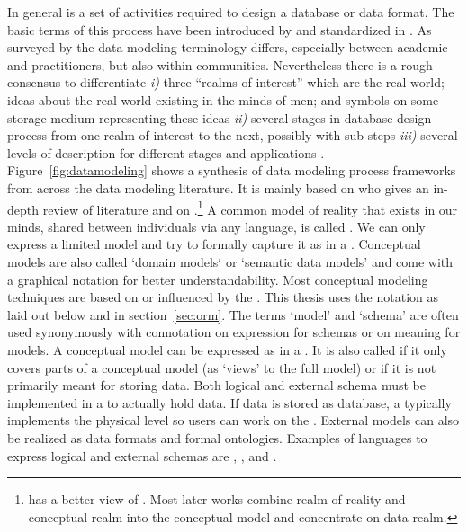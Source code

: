 In general  is a set of activities required to design a
database or data format. The basic terms of this process have been introduced
by \cite{CODASYL1971,Steel1975b} and standardized in \cite{ISO9007}. As surveyed
by \textcite[p.~34ff.]{Simsion2007} the data modeling terminology differs,
especially between academic and practitioners, but also within communities.
Nevertheless there is a rough consensus to differentiate \emph{i)} three
``realms of interest'' which are the real world; ideas about the real world
existing in the minds of men; and symbols on some storage medium representing
these ideas \cite[p. II-1]{Steel1975b} \emph{ii)} several stages in database
design process from one realm of interest to the next, possibly with sub-steps
\cite[ch. 3.1]{Simsion2007} \emph{iii)} several levels of description for
different stages and applications \cite[ch. 2.2.2]{Kent1978}.
Figure~\ref{fig:datamodeling} shows a synthesis of data modeling process
frameworks from across the data modeling literature. It is mainly based on
\cite[fig.~3-1]{Simsion2007} who gives an in-depth review of literature and on
\cite[fig.~2]{Steel1975}.\footnote{\textcite[fig.~2]{Steel1975} has a better
view of \textcite[fig.~VIII~5.1]{Steel1975b}. Most later works combine realm of
reality and conceptual realm into the conceptual model and concentrate on data
realm.} A common model of reality that exists in our minds, shared between
individuals via any language, is called . We can
only express a limited model and try to formally capture it as  in a . Conceptual models are also called `domain
models` or `semantic data models' \cite{Hull1987,Peckham1988} and come with a
graphical notation for better understandability. Most conceptual modeling
techniques are based on or influenced by the  \cite{Chen2007}.  This thesis uses the  notation as laid out below and in section~\ref{sec:orm}.  The
terms `model' and `schema' are often used synonymously with connotation on
expression for schemas or on meaning for models. A conceptual model can be
expressed as  in a .  It
is also called  if it only covers parts of a conceptual
model (as `views' to the full model) or if it is not primarily meant for
storing data. Both logical and external schema must be implemented in a
 to actually hold data. If data is stored as database, a
 typically implements the physical
level so users can work on the . External models can also
be realized as data formats and formal ontologies. Examples of languages to
express logical and external schemas are , , and
.

